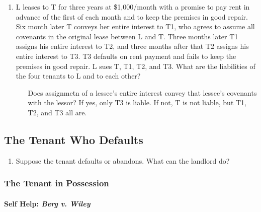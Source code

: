 \begin{enumerate}
\begin{enumerate}
        \item L leases to T for three years at \$1,000/month with a promise to 
        pay rent in advance of the first of each month and to keep the 
        premises in good repair. Six month later T conveys her entire interest 
        to T1, who agrees to assume all covenants in the original lease 
        between L and T. Three months later T1 assigns his entire interest to 
        T2, and three months after that T2 assigns his entire interest to T3. 
        T3 defaults on rent payment and fails to keep the premises in good 
        repair. L sues T, T1, T2, and T3. What are the liabilities of the four 
        tenants to L and to each other?
        \begin{enumerate}
            \item [Does assignmetn of a lessee's entire interest convey that 
            lessee's covenants with the lessor? If yes, only T3 is liable. If 
            not, T is not liable, but T1, T2, and T3 all are.]
        \end{enumerate}
    \end{enumerate}
\end{enumerate}

\subsection{The Tenant Who Defaults}

\begin{enumerate}
    \item Suppose the tenant defaults or abandons. What can the landlord do?
\end{enumerate}

\subsubsection{The Tenant in Possession}

\paragraph{Self Help: \emph{Berg v. Wiley}}

